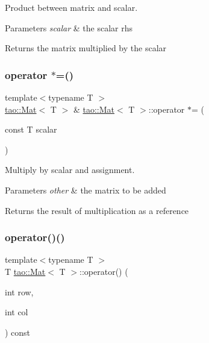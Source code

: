 Product between matrix and scalar. 


\begin{DoxyParams}{Parameters}
{\em scalar} & the scalar rhs \\
\hline
\end{DoxyParams}
\begin{DoxyReturn}{Returns}
the matrix multiplied by the scalar 
\end{DoxyReturn}
\mbox{\label{classtao_1_1_mat_add01ca6b2275ad6d4fbde98056d73276}} 
\subsubsection{\texorpdfstring{operator $\ast$=()}{operator *=()}}
{\footnotesize\ttfamily template$<$typename T $>$ \\
\mbox{\hyperlink{classtao_1_1_mat}{tao\+::\+Mat}}$<$ T $>$ \& \mbox{\hyperlink{classtao_1_1_mat}{tao\+::\+Mat}}$<$ T $>$\+::operator $\ast$= (\begin{DoxyParamCaption}\item[{const T}]{scalar }\end{DoxyParamCaption})}



Multiply by scalar and assignment. 


\begin{DoxyParams}{Parameters}
{\em other} & the matrix to be added \\
\hline
\end{DoxyParams}
\begin{DoxyReturn}{Returns}
the result of multiplication as a reference 
\end{DoxyReturn}
\mbox{\label{classtao_1_1_mat_a814d02bbf96dab62938912f792aa7994}} 
\subsubsection{\texorpdfstring{operator()()}{operator()()}\hspace{0.1cm}{\footnotesize\ttfamily [1/2]}}
{\footnotesize\ttfamily template$<$typename T $>$ \\
T \mbox{\hyperlink{classtao_1_1_mat}{tao\+::\+Mat}}$<$ T $>$\+::operator() (\begin{DoxyParamCaption}\item[{int}]{row,  }\item[{int}]{col }\end{DoxyParamCaption}) const}



